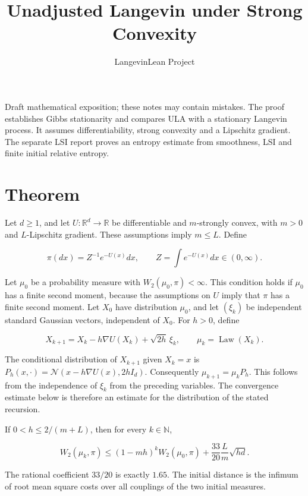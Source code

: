 \documentclass[11pt,a4paper]{article}
\title{\texorpdfstring{Unadjusted Langevin under Strong Convexity}{Unadjusted Langevin under Strong Convexity}}
\author{LangevinLean Project}
\date{}
\begin{document}
\maketitle
Draft mathematical exposition; these notes may contain mistakes.
The proof establishes Gibbs stationarity and compares ULA with a stationary Langevin process. It assumes differentiability, strong convexity and a Lipschitz gradient. The separate LSI report proves an entropy estimate from smoothness, LSI and finite initial relative entropy.
\section{\texorpdfstring{Theorem}{Theorem}}


Let \(d\ge1\), and let \(U:\mathbb R^d\to\mathbb R\) be differentiable and \(m\)-strongly convex, with \(m>0\) and \(L\)-Lipschitz gradient. These assumptions imply \(m\le L\). Define


\[\pi(dx)=Z^{-1}e^{-U(x)}dx,\qquad Z=\int e^{-U(x)}dx\in(0,\infty).\]


Let \(\mu_0\) be a probability measure with \(W_2(\mu_0,\pi)<\infty\). This condition holds if \(\mu_0\) has a finite second moment, because the assumptions on \(U\) imply that \(\pi\) has a finite second moment. Let \(X_0\) have distribution \(\mu_0\), and let \((\xi_k)\) be independent standard Gaussian vectors, independent of \(X_0\). For \(h>0\), define


\[X_{k+1}=X_k-h\nabla U(X_k)+\sqrt{2h}\,\xi_k,\qquad\mu_k=\operatorname{Law}(X_k).\]


The conditional distribution of \(X_{k+1}\) given \(X_k=x\) is \(P_h(x,\cdot)=\mathcal N(x-h\nabla U(x),2hI_d)\). Consequently \(\mu_{k+1}=\mu_kP_h\). This follows from the independence of \(\xi_k\) from the preceding variables. The convergence estimate below is therefore an estimate for the distribution of the stated recursion.




If \(0<h\le2/(m+L)\), then for every \(k\in\mathbb N\),

\[W_2(\mu_k,\pi)\le(1-mh)^kW_2(\mu_0,\pi)+\frac{33}{20}\frac Lm\sqrt{hd}.\]

The rational coefficient \(33/20\) is exactly \(1.65\). The initial distance is the infimum of root mean square costs over all couplings of the two initial measures.
\end{document}
